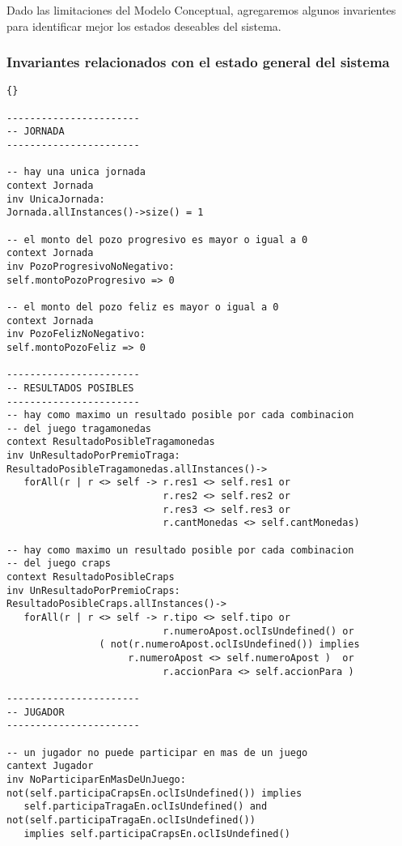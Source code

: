 
\begin{framed}
\depto Dado las limitaciones del Modelo Conceptual, agregaremos algunos invarientes para identificar mejor los estados deseables del sistema.

\subsubsection{Invariantes relacionados con el estado general del sistema}
\lstset{language=ocl}
\lstset{commentstyle=\textit}
\begin{lstlisting}[frame=trbl]{}

-----------------------
-- JORNADA
-----------------------

-- hay una unica jornada
context Jornada
inv UnicaJornada:
Jornada.allInstances()->size() = 1

-- el monto del pozo progresivo es mayor o igual a 0
context Jornada
inv PozoProgresivoNoNegativo:
self.montoPozoProgresivo => 0

-- el monto del pozo feliz es mayor o igual a 0
context Jornada
inv PozoFelizNoNegativo:
self.montoPozoFeliz => 0

-----------------------
-- RESULTADOS POSIBLES
-----------------------
-- hay como maximo un resultado posible por cada combinacion 
-- del juego tragamonedas
context ResultadoPosibleTragamonedas
inv UnResultadoPorPremioTraga:
ResultadoPosibleTragamonedas.allInstances()->
   forAll(r | r <> self -> r.res1 <> self.res1 or
                           r.res2 <> self.res2 or
                           r.res3 <> self.res3 or
                           r.cantMonedas <> self.cantMonedas)

-- hay como maximo un resultado posible por cada combinacion 
-- del juego craps
context ResultadoPosibleCraps
inv UnResultadoPorPremioCraps:
ResultadoPosibleCraps.allInstances()->
   forAll(r | r <> self -> r.tipo <> self.tipo or
                           r.numeroApost.oclIsUndefined() or
                ( not(r.numeroApost.oclIsUndefined()) implies
                     r.numeroApost <> self.numeroApost )  or
                           r.accionPara <> self.accionPara )

-----------------------
-- JUGADOR
-----------------------

-- un jugador no puede participar en mas de un juego
cantext Jugador
inv NoParticiparEnMasDeUnJuego:
not(self.participaCrapsEn.oclIsUndefined()) implies 
   self.participaTragaEn.oclIsUndefined() and
not(self.participaTragaEn.oclIsUndefined()) 
   implies self.participaCrapsEn.oclIsUndefined()


\end{lstlisting}
\end{framed}
